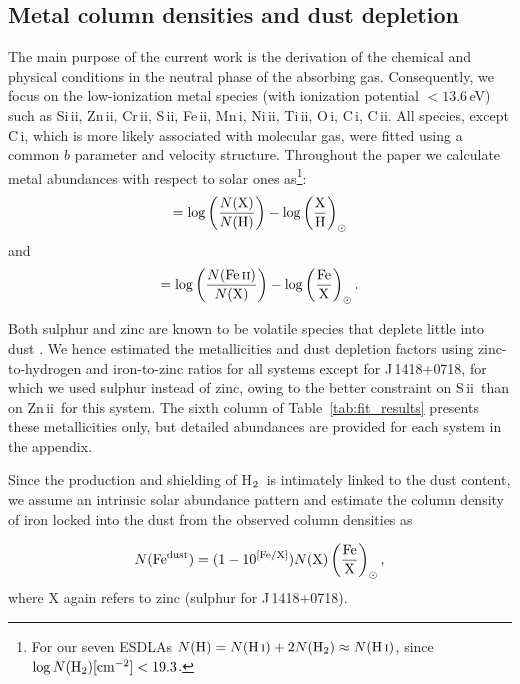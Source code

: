 \documentclass[fleqn,usenatbib,useAMS]{mnras}
\newcommand{\HH}{\mbox{H$\rm _2$}}
\newcommand{\HI}{H\,{\sc i}}
\newcommand{\CI}{C\,{\sc i}}
\newcommand{\CII}{C\,{\sc ii}}
\newcommand{\CrII}{Cr\,{\sc ii}}
\newcommand{\FeII}{Fe\,{\sc ii}}
\newcommand{\MnII}{Mn\,{\sc i}}
\newcommand{\NiII}{Ni\,{\sc ii}}
\newcommand{\OI}{O\,{\sc i}}
\newcommand{\SII}{S\,{\sc ii}}
\newcommand{\SiII}{Si\,{\sc ii}}
\newcommand{\TiII}{Ti\,{\sc ii}}
\newcommand{\ZnII}{Zn\,{\sc ii}}
\begin{document}
\subsection{Metal column densities and dust depletion}\label{subsec:metals_and_depletion}

The main purpose of the current work is the derivation of the chemical and physical conditions in the neutral phase of the absorbing gas. Consequently, we focus on the low-ionization metal species (with ionization potential $<13.6$\,eV) such as \SiII, \ZnII, \CrII, \SII, \FeII, \MnII, \NiII, \TiII, \OI, \CI, \CII. All species, except \CI, which is more likely associated with molecular gas, were fitted using a common $b$ parameter and velocity structure. Throughout the paper we calculate metal abundances with respect to solar ones \citep[from][]{Asplund2009} as\footnote{For our seven ESDLAs $N({\rm H})=N(\text{\HI})+2N(\HH)\approx N(\text{\HI})$, since 
$\log N(\HH)\text{[cm$^{-2}$]} < 19.3$.}:
\begin{equation}
    [{\rm X/H}] = \log \left( \frac{N({\rm X})}{N({\rm \text{H}})} \right) - \log \left(\frac{{\rm X}}{{\rm H}} \right)_\odot
\end{equation}
and
\begin{equation}
    [{\rm Fe/X}] = \log \left( \frac{N({\rm \text{\FeII}})}{N({\rm X})} \right) - \log \left(\frac{{\rm Fe}}{{\rm X}} \right)_\odot.
\end{equation}

Both sulphur and zinc are known to be volatile species that deplete little into dust \citep[e.g.]{Vladilo2000}. 
We hence estimated the metallicities and dust depletion factors using zinc-to-hydrogen and iron-to-zinc ratios for all systems except for J\,1418$+$0718, for which we used sulphur instead of zinc, 
owing to the better constraint on \SII\ than on \ZnII\ for this system.
The sixth column of Table~\ref{tab:fit_results} presents these metallicities only, but detailed abundances are provided for each system in the appendix.

Since the production and shielding of \HH\ 
is intimately linked to the dust content, 
we assume an intrinsic solar abundance pattern and estimate the 
column density of iron locked into the dust from the observed column densities as

\begin{equation}
    N({\rm Fe^{dust}}) = (1-10^{\rm[Fe/X]}) N({\rm X})\left(\frac{{\rm Fe}}{\rm{X}}\right)_\odot,
\end{equation}
where X again refers to zinc (sulphur for J\,1418$+$0718).
\end{document}
